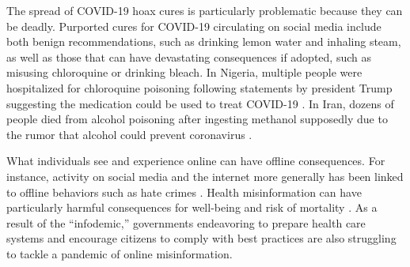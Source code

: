 \documentclass[letterpaper, 12pt, parskip=full,DIV=10]{scrartcl}
\begin{document}
The spread of COVID-19 hoax cures is particularly problematic because they can be deadly. Purported cures for COVID-19 circulating on social media include both benign recommendations, such as drinking lemon water and inhaling steam, as well as those that can have devastating consequences if adopted, such as misusing chloroquine or drinking bleach. In Nigeria, multiple people were hospitalized for chloroquine poisoning following statements by president Trump suggesting the medication could be used to treat COVID-19 \citep{busari2020nigeria}. In Iran, dozens of people died from alcohol poisoning after ingesting methanol supposedly due to the rumor that alcohol could prevent coronavirus \citep{haghdoost2020alcohol}. 


What individuals see and experience online can have offline consequences. For instance, activity on social media and the internet more generally has been linked to offline behaviors such as hate crimes \citep{muller2019fanning, chan2016internet}. Health misinformation can have particularly harmful consequences for well-being and risk of mortality \citep{swire2020public}. As a result of the ``infodemic,'' governments endeavoring to prepare health care systems and encourage citizens to comply with best practices are also struggling to tackle a pandemic of online misinformation.
\end{document}
